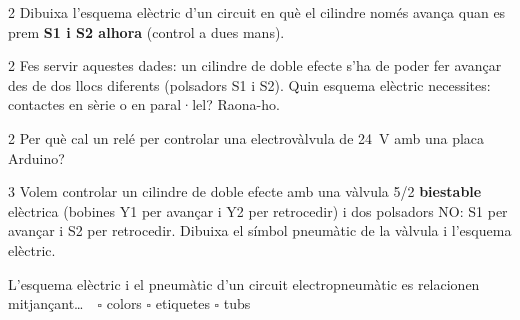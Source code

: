 \begin{exercici}{2}
Dibuixa l'esquema elèctric d'un circuit en què el cilindre només avança quan es prem \textbf{S1 i S2 alhora} (control a dues mans).
\begin{center}\fbox{\rule{0pt}{3.6cm}\hspace{5cm}}\end{center}
\end{exercici}

\begin{exercici}{2}
Fes servir aquestes dades: un cilindre de doble efecte s'ha de poder fer avançar des de dos llocs diferents (polsadors S1 i S2). Quin esquema elèctric necessites: contactes en sèrie o en paral·lel? Raona-ho.
\end{exercici}

\begin{exercici}{2}
Per què cal un relé per controlar una electrovàlvula de \SI{24}{\volt} amb una placa Arduino?
\end{exercici}

\begin{exercici}{3}
Volem controlar un cilindre de doble efecte amb una vàlvula 5/2 \textbf{biestable} elèctrica (bobines Y1 per avançar i Y2 per retrocedir) i dos polsadors NO: S1 per avançar i S2 per retrocedir. Dibuixa el símbol pneumàtic de la vàlvula i l'esquema elèctric.
\begin{center}\fbox{\rule{0pt}{4.4cm}\hspace{9cm}}\end{center}
\end{exercici}

\begin{comprova}
L'esquema elèctric i el pneumàtic d'un circuit electropneumàtic es relacionen mitjançant\ldots\ \ $\square$ colors \quad $\square$ etiquetes \quad $\square$ tubs
\end{comprova}
